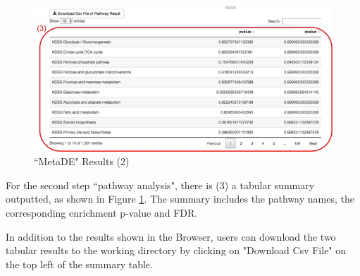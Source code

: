 \begin{figure}[H]
\begin{center}
\includegraphics[scale=0.45]{./figure/metaDE/metaDEresult2.jpg}
\caption{``MetaDE" Results (2)}
\label{fig:MetaDEresult2}
\end{center}
\end{figure}

For the second step ``pathway analysis", there is (3) a tabular summary outputted, as shown in Figure \ref{fig:MetaDEresult2}. The summary includes the pathway names, the corresponding enrichment p-value and FDR. 

In addition to the results shown in the Browser, users can download the two tabular results to the working directory by clicking on "Download Csv File" on the top left of the summary table. 

